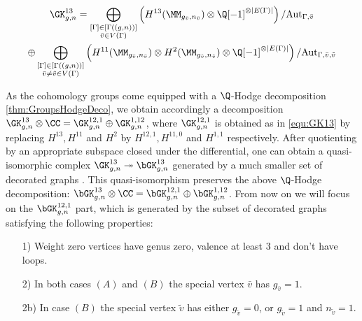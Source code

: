 \begin{multline}\label{equ:GK13}
    \GK^{13}_{g,n}
    = \bigoplus_{\substack{ [\Gamma]\in[\Gamma((g,n))] \\ \bar{v}\in V(\Gamma)}}
    \left( H^{13}(\MM_{g_{\bar{v}},n_{\bar{v}}}) \otimes \Q[-1]^{\otimes |E(\Gamma)|} \right)/\text{Aut}_{\Gamma,\bar{v}} \\
    \oplus \bigoplus_{\substack{ [\Gamma]\in[\Gamma((g,n))] \\ \bar{v}\neq\tilde{v}\in V(\Gamma)}}
    \left( H^{11}(\MM_{g_{\bar{v}},n_{\bar{v}}}) \otimes H^{2}(\MM_{g_{\tilde{v}},n_{\tilde{v}}}) \otimes \Q[-1]^{\otimes |E(\Gamma)|} \right)/\text{Aut}_{\Gamma,\bar{v},\tilde{v}}
\end{multline}


As the cohomology groups come equipped with a $\Q$-Hodge decomposition \ref{thm:GroupsHodgeDeco}, we obtain accordingly a decomposition $\GK_{g,n}^{13}\otimes\CC = \GK_{g,n}^{12,1} \oplus \GK_{g,n}^{1,12}$, where $\GK_{g,n}^{12,1}$ is obtained as in \ref{equ:GK13} by replacing $H^{13}, H^{11}$ and $H^{2}$ by $H^{12,1}, H^{11,0}$ and $H^{1,1}$ respectively. After quotienting by an appropriate subspace closed under the differential, one can obtain a quasi-isomorphic complex $\GK_{g,n}^{13}\twoheadrightarrow \bGK_{g,n}^{13}$ generated by a much smaller set of decorated graphs \cite[Section 2.2]{CLPW2}. This quasi-isomorphism preserves the above $\Q$-Hodge decomposition: $\bGK_{g,n}^{13}\otimes\CC = \bGK_{g,n}^{12,1} \oplus \bGK_{g,n}^{1,12}$. From now on we will focus on the $\bGK_{g,n}^{12,1}$ part, which is generated by the subset of decorated graphs satisfying the following properties:

\begin{enumerate}
    \item[1)] Weight zero vertices have genus zero, valence at least $3$ and don't have loops.
    \item[2)] In both cases $(A)$ and $(B)$ the special vertex $\bar{v}$ has $g_{\bar{v}}=1$.
    \item[2b)] In case $(B)$ the special vertex $\tilde{v}$ has either $g_{\tilde{v}}=0$, or $g_{\tilde{v}}=1$ and $n_{\tilde{v}}=1$.
\end{enumerate}

